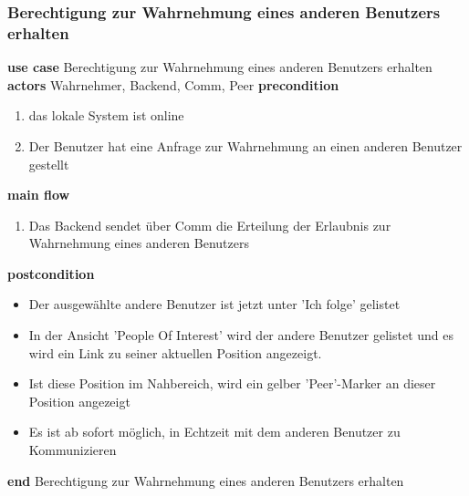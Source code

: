 \subsubsection{Berechtigung zur Wahrnehmung eines anderen Benutzers erhalten}\label{subsubsec:uc_watchgrantmefollowpeer}
\noindent \textbf{use case} Berechtigung zur Wahrnehmung eines anderen Benutzers erhalten \newline
\indent \textbf{actors} \newline
\indent \indent Wahrnehmer, Backend, Comm, Peer \newline
\indent \textbf{precondition}
\begin{enumerate}[labelwidth=0pt,leftmargin=39pt,noitemsep,topsep=0pt,parsep=0pt,partopsep=0pt]
\item das lokale System ist online
\item Der Benutzer hat eine Anfrage zur Wahrnehmung an einen anderen Benutzer gestellt
\end{enumerate}
\indent \indent \textbf{main flow}
\begin{enumerate}[labelwidth=0pt,leftmargin=39pt,noitemsep,topsep=0pt,parsep=0pt,partopsep=0pt]
\item Das Backend sendet über Comm die Erteilung der Erlaubnis zur Wahrnehmung eines anderen Benutzers
\end{enumerate}
\indent \indent \textbf{postcondition}
\begin{itemize}[label={},labelwidth=0pt,leftmargin=24pt,noitemsep,topsep=0pt,parsep=0pt,partopsep=0pt]
\item Der ausgewählte andere Benutzer ist jetzt unter 'Ich folge' gelistet
\item In der Ansicht 'People Of Interest' wird der andere Benutzer gelistet und es wird ein Link zu seiner aktuellen Position angezeigt.
\item Ist diese Position im Nahbereich, wird ein gelber 'Peer'-Marker an dieser Position angezeigt
\item Es ist ab sofort möglich, in Echtzeit mit dem anderen Benutzer zu Kommunizieren
\end{itemize}
\noindent \textbf{end} Berechtigung zur Wahrnehmung eines anderen Benutzers erhalten

